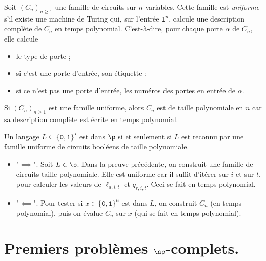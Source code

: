 \documentclass[./main]{subfiles}
\begin{document}
  \begin{defn}
    Soit $(C_n)_{n \ge 1}$ une famille de circuits sur $n$ variables.
    Cette famille est \textit{uniforme} s'il existe une machine de Turing qui, sur l'entrée $\texttt{1}^n$, calcule une description complète de $C_n$ en temps polynomial.
    C'est-à-dire, pour chaque porte $\alpha$ de $C_n$, elle calcule 
    \begin{itemize}
      \item le type de porte ;
      \item si c'est une porte d'entrée, son étiquette ;
      \item si ce n'est pas une porte d'entrée, les numéros des portes en entrée de $\alpha$.
    \end{itemize}
  \end{defn}

  \begin{rmk}
    Si $(C_n)_{n \ge 1}$ est une famille uniforme, alors $C_n$ est de taille polynomiale en $n$ car sa description complète est écrite en temps polynomial.
  \end{rmk}

  \begin{thm}
    Un langage $L \subseteq \{\texttt{0}, \texttt{1}\}^\star$ est dans $\p$ si et seulement si $L$ est reconnu par une famille uniforme de circuits booléens de taille polynomiale.
  \end{thm}
  \begin{prv}
    \begin{itemize}
      \item "$\implies$".
        Soit $L \in \p$.
        Dans la preuve précédente, on construit une famille de circuits taille polynomiale.
        Elle est uniforme car il suffit d'itérer sur $i$ et sur $t$, pour calculer les valeurs de $\ell_{a, i, t}$ et $q_{r, i, t}$.
        Ceci se fait en temps polynomial.
      \item "$\impliedby$".
        Pour tester si $x \in \{\texttt{0}, \texttt{1}\}^n$ est dans $L$, on construit $C_n$ (en temps polynomial), puis on évalue $C_n$ sur $x$ (qui se fait en temps polynomial).
    \end{itemize}
  \end{prv}

  \section{Premiers problèmes $\np$-complets.}
\end{document}
